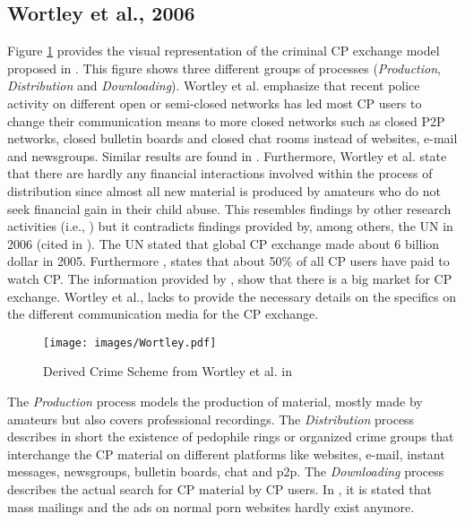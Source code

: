 \documentclass{sig-alternate-br}
\begin{document}
\subsection{Wortley et al., 2006 \cite{wortley2006child}}
Figure \ref{fig:wortley_01} provides the visual representation of the criminal CP exchange model proposed in \cite{wortley2006child}. This figure shows three different groups of processes (\textit{Production}, \textit{Distribution} and \textit{Downloading}).
Wortley et al. \cite{wortley2006child} emphasize that recent police activity on different open or semi-closed networks has led most CP users to change their communication means to more closed networks such as closed P2P networks, closed bulletin boards and closed chat rooms instead of websites, e-mail and newsgroups. Similar results are found in \cite{wijk2009achter, callanan2009internet}. Furthermore, Wortley et al. state that there are hardly any financial interactions involved within the process of distribution since almost all new material is produced by amateurs who do not seek financial gain in their child abuse. This resembles findings by other research activities (i.e., \cite{beech2008internet,wijk2009achter}) but it contradicts findings provided by, among others, the UN in 2006 (cited in \cite{wijk2009achter}). The UN stated that global CP exchange made about 6 billion dollar in 2005. Furthermore \cite{webb2007characteristics}, states that about 50\% of all CP users have paid to watch CP. The information provided by \cite{beech2008internet,wijk2009achter}, \cite{webb2007characteristics} show that there is a big market for CP exchange. Wortley et al., \cite{wortley2006child} lacks to provide the necessary details on the specifics on the different communication media for the CP exchange.

\begin{figure}[ht]
\centering
\texttt{[image: images/Wortley.pdf]}
\caption{Derived Crime Scheme from Wortley et al. in \cite{wortley2006child}}
\label{fig:wortley_01}
\end{figure}

The \textit{Production} process models the production of material, mostly made by amateurs but also covers professional recordings. The \textit{Distribution} process describes in short the existence of pedophile rings or organized crime groups that interchange the CP material on different platforms like websites, e-mail, instant messages, newsgroups, bulletin boards, chat and p2p. The \textit{Downloading} process describes the actual search for CP material by CP users. In \cite{wortley2006child}, it is stated that mass mailings and the ads on normal porn websites hardly exist anymore.
\end{document}
